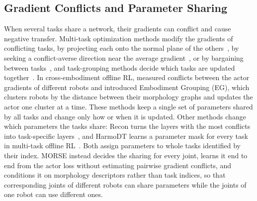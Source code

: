 \subsection{Gradient Conflicts and Parameter Sharing}
When several tasks share a network, their gradients can conflict and cause negative transfer. Multi-task optimization
methods modify the gradients of conflicting tasks, by projecting each onto the normal plane of the
others~\citep{yu2020pcgrad}, by seeking a conflict-averse direction near the average gradient~\citep{liu2021cagrad},
or by bargaining between tasks~\citep{navon2022nashmtl}, and task-grouping methods decide which tasks are updated
together~\citep{standley2020which,fifty2021tag,jeong2025sel}. In cross-embodiment offline RL,
\citet{abe2026crossembodimentoffline} measured conflicts between the actor gradients of different robots and
introduced Embodiment Grouping (EG), which clusters robots by the distance between their morphology graphs and updates
the actor one cluster at a time. These methods keep a single set of parameters shared by all tasks and change only how
or when it is updated. Other methods change which parameters the tasks share: Recon turns the layers with the most
conflicts into task-specific layers~\citep{shi2023recon}, and HarmoDT learns a parameter mask for every task in
multi-task offline RL~\citep{hu2024harmodt}. Both assign parameters to whole tasks identified by their index. MORSE
instead decides the sharing for every joint, learns it end to end from the actor loss without estimating pairwise
gradient conflicts, and conditions it on morphology descriptors rather than task indices, so that corresponding joints
of different robots can share parameters while the joints of one robot can use different ones.

